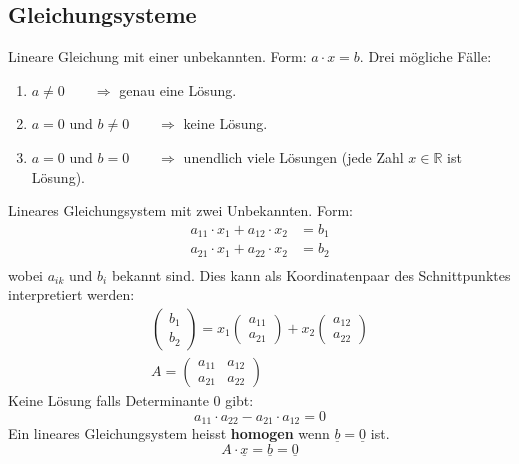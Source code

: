 \subsection{Gleichungsysteme}
Lineare Gleichung mit einer unbekannten. Form: $a\cdot x = b$.
Drei m\"ogliche F\"alle:
\begin{enumerate}
  \item $a\neq 0\qquad\Longrightarrow$ genau eine L\"osung.
  \item $a=0$ und $b \neq 0 \qquad\Longrightarrow$ keine L\"osung.
  \item $a=0$ und $b=0 \qquad\Longrightarrow$ unendlich viele L\"osungen
  (jede Zahl $x \in \mathbb{R}$ ist L\"osung).
\end{enumerate}
Lineares Gleichungsystem mit zwei Unbekannten. Form:
\begin{align*}
  a_{11}\cdot x_1 + a_{12}\cdot x_2 &= b_1 \\
  a_{21}\cdot x_1 + a_{22}\cdot x_2 &= b_2 \\
\end{align*}
wobei $a_{ik}$ und $b_i$ bekannt sind.
Dies kann als Koordinatenpaar des Schnittpunktes interpretiert werden:
\begin{gather*}
  \begin{pmatrix}b_1 \\ b_2\end{pmatrix} = x_1\begin{pmatrix}a_{11} \\ a_{21}\end{pmatrix}
    + x_2\begin{pmatrix}a_{12} \\ a_{22}\end{pmatrix} \\
  A = \begin{pmatrix}a_{11} & a_{12} \\ a_{21} & a_{22}\end{pmatrix}
\end{gather*}
Keine L\"osung falls Determinante 0 gibt:
\begin{equation*}
  a_{11}\cdot a_{22}- a_{21}\cdot a_{12} = 0
\end{equation*}
Ein lineares Gleichungsystem heisst \textbf{homogen} wenn $\underline{b}=\underline{0}$ ist.
\begin{equation*}
  A\cdot\underline{x} = \underline{b} = \underline{0}
\end{equation*}

